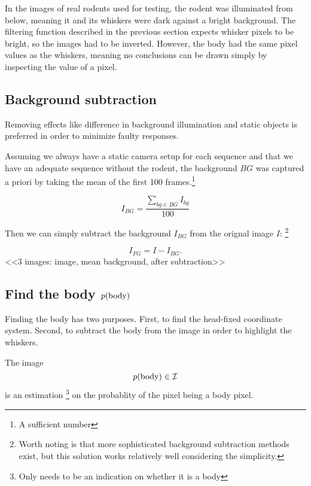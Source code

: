 In the images of real rodents used for testing, the rodent was
illuminated from below, meaning it and its whiskers were dark against
a bright background. The filtering function described in the previous
section expects whisker pixels to be bright, so the images had to be
inverted. However, the body had the same pixel values as the whiskers,
meaning no conclusions can be drawn simply by inspecting the value of
a pixel.

\subsection{Background subtraction}
Removing effects like difference in background illumination and static
objects is preferred in order to minimize faulty responses.

Assuming we always have a static camera setup for each sequence and
that we have an adequate sequence without the rodent, the background
$BG$ was captured a priori by taking the mean of the first 100
frames.\footnote{A sufficient number}

\begin{equation}
  I_{BG} = \frac{\sum\limits_{bg\in BG}{I_{bg}}}{100}
\end{equation}

Then we can simply subtract the background $I_{BG}$ from the orignal
image $I$: \footnote{Worth noting is that more sophisticated
  background subtraction methods exist, but this solution works
  relatively well considering the simplicity.}

\begin{equation}
  I_{FG} = I - I_{BG}.
\end{equation}
<<3 images: image, mean background, after subtraction>>

\subsection{Find the body $p{(\text{body})}$}
\label{sec:findbody}
Finding the body has two purposes. First, to find the head-fixed
coordinate system. Second, to subtract the body from the image in
order to highlight the whiskers.

\begin{definition}
  The image
  \begin{equation}
    p{(\text{body})}\in \mathcal{I}
  \end{equation} is an estimation \footnote{Only needs to be an
    indication on whether it is a body} on the probablity of the pixel
  being a body pixel.
\end{definition}

